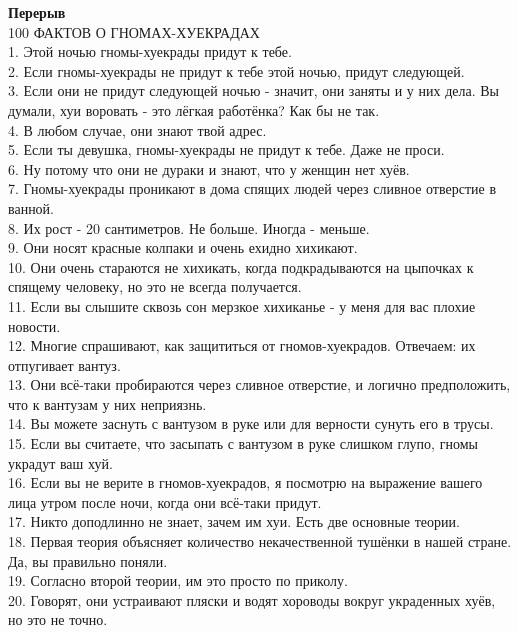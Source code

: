 \documentclass[a4paper,20pt,notitlepage]{extbook}
\begin{document}
		{\bf \Large Перерыв }\\
	100 ФАКТОВ О ГНОМАХ-ХУЕКРАДАХ\\
	1. Этой ночью гномы-хуекрады придут к тебе.\\
	2. Если гномы-хуекрады не придут к тебе этой ночью, придут следующей.\\
	3. Если они не придут следующей ночью - значит, они заняты и у них дела. Вы думали, хуи воровать - это лёгкая работёнка? Как бы не так.\\
	4. В любом случае, они знают твой адрес.\\
	5. Если ты девушка, гномы-хуекрады не придут к тебе. Даже не проси.\\
	6. Ну потому что они не дураки и знают, что у женщин нет хуёв.\\
	7. Гномы-хуекрады проникают в дома спящих людей через сливное отверстие в ванной.\\
	8. Их рост - 20 сантиметров. Не больше. Иногда - меньше.\\
	9. Они носят красные колпаки и очень ехидно хихикают.\\
	10. Они очень стараются не хихикать, когда подкрадываются на цыпочках к спящему человеку, но это не всегда получается.\\
	11. Если вы слышите сквозь сон мерзкое хихиканье - у меня для вас плохие новости.\\
	12. Многие спрашивают, как защититься от гномов-хуекрадов. Отвечаем: их отпугивает вантуз.\\
	13. Они всё-таки пробираются через сливное отверстие, и логично предположить, что к вантузам у них неприязнь.\\
	14. Вы можете заснуть с вантузом в руке или для верности сунуть его в трусы.\\
	15. Если вы считаете, что засыпать с вантузом в руке слишком глупо, гномы украдут ваш хуй.\\
	16. Если вы не верите в гномов-хуекрадов, я посмотрю на выражение вашего лица утром после ночи, когда они всё-таки придут.\\
	17. Никто доподлинно не знает, зачем им хуи. Есть две основные теории.\\
	18. Первая теория объясняет количество некачественной тушёнки в нашей стране. Да, вы правильно поняли.\\
	19. Согласно второй теории, им это просто по приколу.\\
	20. Говорят, они устраивают пляски и водят хороводы вокруг украденных хуёв, но это не точно.\\
\end{document}
